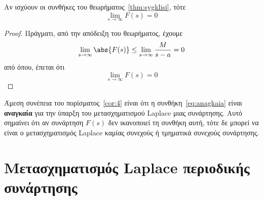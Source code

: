 \documentclass[a4paper,table]{report}
\begin{document}
\begin{cor}\label{cor:4}
  Αν ισχύουν οι συνθήκες του θεωρήματος~\ref{thm:sygklisi}, τότε
  \begin{equation}\label{eq:anagkaia}
    \lim_{s \to \infty} F(s) = 0 
  \end{equation} 
\end{cor}
\begin{proof}
  Πράγματι, από την απόδειξη του θεωρήματος, έχουμε
  \[
    \lim_{s \to \infty} \abs{F(s)} \leq \lim_{s \to \infty} \frac{M}{s-a} = 0
  \] 
  από όπου, έπεται ότι
  \[
    \lim_{s \to \infty} F(s) = 0 
  \]
\end{proof}
\begin{rem}
  Άμεση συνέπεια του πορίσματος~\ref{cor:4} είναι ότι η συνθήκη~\eqref{eq:anagkaia} 
  είναι \textbf{αναγκαία} για την ύπαρξη του μετασχηματισμού Laplace μιας συνάρτησης. 
  Αυτό σημαίνει ότι αν συνάρτηση $F(s)$ δεν ικανοποιεί τη συνθήκη αυτή, τότε δε 
  μπορεί να είναι ο μετασχηματισμός Laplace καμίας συνεχούς ή τμηματικά συνεχούς 
  συνάρτησης.
\end{rem}

\section*{Μετασχηματισμός Laplace περιοδικής συνάρτησης}
\end{document}
